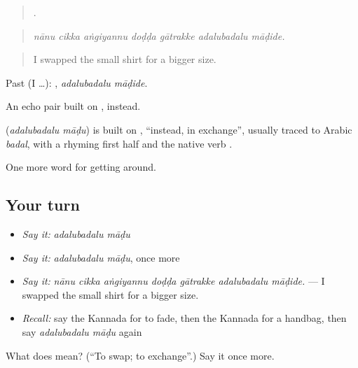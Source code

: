 \begin{quote}
      .
\end{quote}

\begin{quote}
\emph{nānu cikka aṅgiyannu doḍḍa gātrakke adalubadalu māḍide.}
\end{quote}

\begin{quote}
I swapped the small shirt for a bigger size.
\end{quote}

Past (I …):  , \emph{adalubadalu māḍide}.

An echo pair built on , instead.

\begin{cousinweb}
\textbf{ } (\emph{adalubadalu māḍu}) is built on , \textquotedblleft{}instead, in exchange\textquotedblright{}, usually traced to Arabic \emph{badal}, with a rhyming first half and the native verb .
\end{cousinweb}

\begin{grammarlens}[title={What you've built}]
One more word for getting around.
\end{grammarlens}

\subsection*{Your turn}
\begin{itemize}
\raggedright
  \item \emph{Say it:} \emph{adalubadalu māḍu}
  \item \emph{Say it:} \emph{adalubadalu māḍu}, once more
  \item \emph{Say it:} \emph{nānu cikka aṅgiyannu doḍḍa gātrakke adalubadalu māḍide.} — I swapped the small shirt for a bigger size.
  \item \emph{Recall:} say the Kannada for to fade, then the Kannada for a handbag, then say \emph{adalubadalu māḍu} again
\end{itemize}

\begin{tcolorbox}[breakable,colback=teal!4,colframe=teal!35!black,title={Before you move on}]
What does   mean? (\textquotedblleft{}To swap; to exchange\textquotedblright{}.) Say it once more.
\end{tcolorbox}
